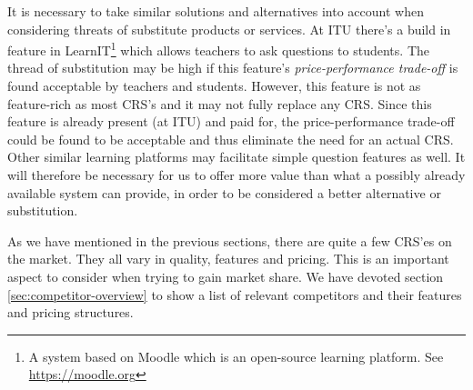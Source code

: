 It is necessary to take similar solutions and alternatives into account when considering threats of substitute products or services. At ITU there's a build in feature in LearnIT\footnote{A system based on Moodle which is an open-source learning platform. See \url{https://moodle.org}} which allows teachers to ask questions to students. The thread of substitution may be high if this feature's \emph{price-performance trade-off} is found acceptable by teachers and students. However, this feature is not as feature-rich as most CRS's and it may not fully replace any CRS. Since this feature is already present (at ITU) and paid for, the price-performance trade-off could be found to be acceptable and thus eliminate the need for an actual CRS. Other similar learning platforms may facilitate simple question features as well. It will therefore be necessary for us to offer more value than what a possibly already available system can provide, in order to be considered a better alternative or substitution. 


As we have mentioned in the previous sections, there are quite a few CRS'es on the market. They all vary in quality, features and pricing. This is an important aspect to consider when trying to gain market share. We have devoted section \ref{sec:competitor-overview} to show a list of relevant competitors and their features and pricing structures.








